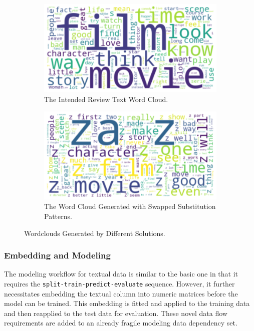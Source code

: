 \begin{figure}[h]
    \centering
    \begin{subfigure}[t]{.47\textwidth}
        \centering
        \includegraphics[width=\textwidth]{Tex//images//native_ape_eval//wordcloud_intended.png}
        \caption{The Intended Review Text Word Cloud.}
        \label{fig:native_ape_wordcloud_intended}
    \end{subfigure}%
    \hfill
    \begin{subfigure}[t]{.47\textwidth}
        \centering
        \includegraphics[width=\textwidth]{Tex//images//native_ape_eval//wordcloud_swap.png}
        \caption{The Word Cloud Generated with Swapped Substitution Patterns.}
        \label{fig:native_ape_wordcloud_swap}
    \end{subfigure}
    \caption{Wordclouds Generated by Different Solutions.}
    \label{fig:native_ape_double_wordcloud}
\end{figure}

\subsubsection{Embedding and Modeling}

The modeling workflow for textual data is similar to the basic one in that it requires the \verb|split-train-predict-evaluate| sequence. However, it further necessitates embedding the textual column into numeric matrices before the model can be trained. This embedding is fitted and applied to the training data and then reapplied to the test data for evaluation. These novel data flow requirements are added to an already fragile modeling data dependency set.

